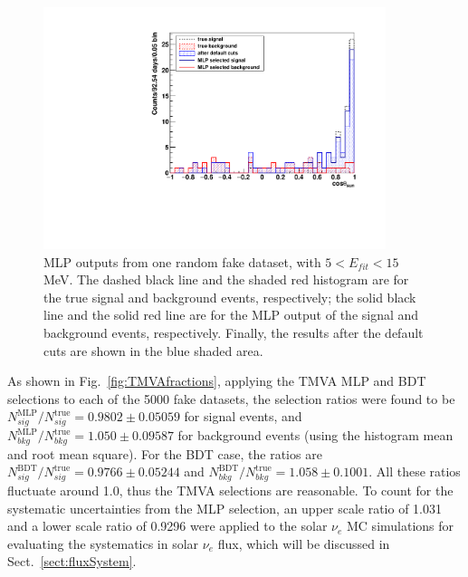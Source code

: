 \begin{figure}[!htb]
	\centering
	\includegraphics[width=10cm]{tmvaHalfFakeData3991_output.pdf}
	\caption[MLP outputs from one random fake dataset ($5<E_{fit}<15$ MeV).]{MLP outputs from one random fake dataset, with $5<E_{fit}<15$ MeV. The dashed black line and the shaded red histogram are for the true signal and background events, respectively; the solid black line and the solid red line are for the MLP output of the signal and background events, respectively. Finally, the results after the default cuts are shown in the blue shaded area.\label{fig:BDToutputs}}
\end{figure}

As shown in Fig.~\ref{fig:TMVAfractions}, applying the TMVA MLP and BDT selections to each of the 5000 fake datasets, the selection ratios were found to be $N^\mathrm{MLP}_{sig}/N^\mathrm{true}_{sig}=0.9802\pm0.05059$ for signal events, and $N^\mathrm{MLP}_{bkg}/N^\mathrm{true}_{bkg}=1.050\pm0.09587$ for background events (using the histogram mean and root mean square). For the BDT case, the ratios are $N^\mathrm{BDT}_{sig}/N^\mathrm{true}_{sig}=0.9766\pm 0.05244$ and $N^\mathrm{BDT}_{bkg}/N^{\mathrm{true}}_{bkg}=1.058\pm 0.1001$. All these ratios fluctuate around 1.0, thus the TMVA selections are reasonable. To count for the systematic uncertainties from the MLP selection, an upper scale ratio of 1.031 and a lower scale ratio of 0.9296 were applied to the solar $\nu_e$ MC simulations for evaluating the systematics in solar $\nu_e$ flux, which will be discussed in Sect.~\ref{sect:fluxSystem}.

